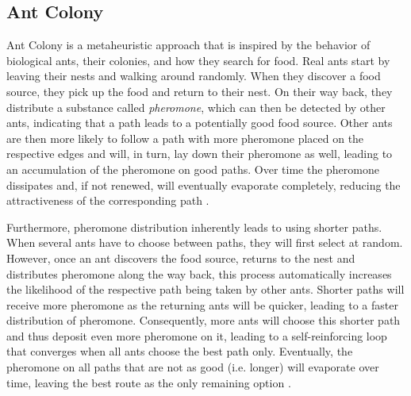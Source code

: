 \subsection{Ant Colony}
\label{subsec:antColonyBackground}

Ant Colony is a metaheuristic approach that is inspired by the behavior of biological ants, their colonies, and how they search for food.
Real ants start by leaving their nests and walking around randomly. 
When they discover a food source, they pick up the food and return to their nest.
On their way back, they distribute a substance called \textit{pheromone}, which can then be detected by other ants, indicating that a path leads to a potentially good food source. 
Other ants are then more likely to follow a path with more pheromone placed on the respective edges and will, in turn, lay down their pheromone as well, leading to an accumulation of the pheromone on good paths.
Over time the pheromone dissipates and, if not renewed, will eventually evaporate completely, reducing the attractiveness of the corresponding path \cite{dorigo_ant_1996, gendreau_handbook_2010}. 

Furthermore, pheromone distribution inherently leads to using shorter paths. 
When several ants have to choose between paths, they will first select at random.
However, once an ant discovers the food source, returns to the nest and distributes pheromone along the way back, this process automatically increases the likelihood of the respective path being taken by other ants.
Shorter paths will receive more pheromone as the returning ants will be quicker, leading to a faster distribution of pheromone.
Consequently, more ants will choose this shorter path and thus deposit even more pheromone on it, leading to a self-reinforcing loop that converges when all ants choose the best path only.
Eventually, the pheromone on all paths that are not as good (i.e. longer) will evaporate over time, leaving the best route as the only remaining option \cite{dorigo_ant_1996, gendreau_handbook_2010}.

